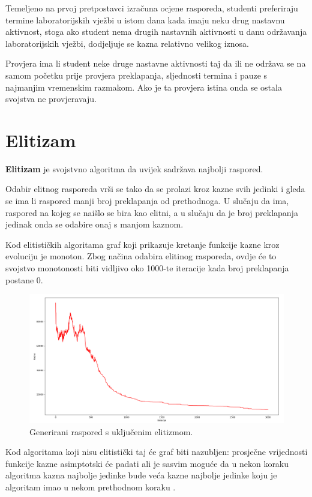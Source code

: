 \documentclass[times, utf8, zavrsni]{fer}
\begin{document}
Temeljeno na prvoj pretpostavci izračuna ocjene rasporeda, studenti preferiraju termine laboratorijskih vježbi u istom dana kada imaju neku drug nastavnu aktivnost, stoga ako student nema drugih nastavnih aktivnosti u danu održavanja laboratorijskih vježbi, dodjeljuje se kazna relativno velikog iznosa.

Provjera ima li student neke druge nastavne aktivnosti taj da ili ne održava se na samom početku prije provjera preklapanja, sljednosti termina i pauze s najmanjim vremenskim razmakom. Ako je ta provjera istina onda se ostala svojstva ne provjeravaju.

\section{Elitizam}

\textbf{Elitizam}  je svojstvno algoritma da uvijek sadržava najbolji raspored.

Odabir elitnog rasporeda vrši se tako da se prolazi kroz kazne svih jedinki i gleda se ima li raspored manji broj preklapanja od prethodnoga. U slučaju da ima, raspored na kojeg se naišlo se bira kao elitni, a u slučaju da je broj preklapanja jedinak onda se odabire onaj s manjom kaznom.

Kod elitističkih algoritama graf koji prikazuje kretanje funkcije kazne kroz evoluciju je monoton. Zbog načina odabira elitinog rasporeda, ovdje će to svojstvo monotonosti biti vidljivo oko 1000-te iteracije kada broj preklapanja postane 0.

\begin{figure}[htb]
\centering
\includegraphics[width=14cm]{images/elitizam_da.png}
\caption{Generirani raspored s uključenim elitizmom.}
\label{fig:elitiziam_da}
\end{figure}

Kod algoritama koji nisu elitistički taj će graf biti nazubljen: prosječne vrijednosti funkcije kazne asimptotski će padati ali je sasvim moguće da u nekon koraku algoritma kazna najbolje jedinke bude veća kazne najbolje jedinke koju je algoritam imao u nekom prethodnom koraku \citep{cupic-skripta}.
\end{document}
